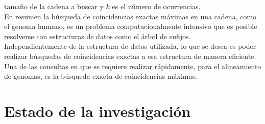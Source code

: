 \documentclass[12pt,a4paper]{article}
\begin{document}
tamaño de la cadena a buscar y $k$ es el número de ocurrencias.\\
En resumen la búsqueda de coincidencias exactas máximas en una cadena, como el 
genoma humano, es un problema computacionalmente intensivo que es posible 
resolverse con estructuras de datos como el árbol de sufijos. 
\\Independientemente de la estructura de datos utilizada, lo que se desea es poder
realizar búsquedas de coincidencias exactas a esa estructura de manera eficiente. 
Una de las consultas en que se requiere realizar rápidamente, para el alineamiento 
de genomas, es la búsqueda exacta de coincidencias máximas. 
\section{Estado de la investigación}
\end{document}
